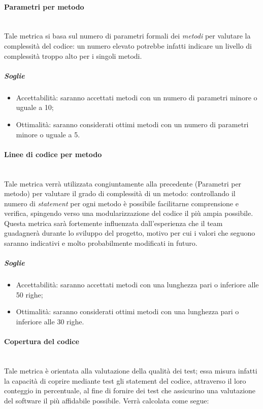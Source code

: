 \paragraph{Parametri per metodo}
	~\\Tale metrica si basa sul numero di parametri formali dei \emph{metodi} per valutare la complessità del codice: un numero elevato potrebbe infatti indicare un livello di complessità troppo alto per i singoli metodi.

\subparagraph{Soglie}
	\begin{itemize}
	\item Accettabilità: saranno accettati metodi con un numero di parametri minore o uguale a 10;
	\item Ottimalità: saranno considerati ottimi metodi con un numero di parametri minore o uguale a 5.
	\end{itemize}

\paragraph{Linee di codice per metodo}
	~\\Tale metrica verrà utilizzata congiuntamente alla precedente (Parametri per metodo) per valutare il grado di complessità di un metodo: controllando il numero di \emph{statement} per ogni metodo è possibile facilitarne comprensione e verifica, spingendo verso una modularizzazione del codice il più ampia possibile. 
Questa metrica sarà fortemente influenzata dall'esperienza che il team guadagnerà durante lo sviluppo del progetto, motivo per cui i valori che seguono saranno indicativi e molto probabilmente modificati in futuro.

\subparagraph{Soglie}
	\begin{itemize}
	\item Accettabilità: saranno accettati metodi con una lunghezza pari o inferiore alle  50 righe;
	\item Ottimalità: saranno considerati ottimi metodi con una lunghezza pari o inferiore alle 30 righe.
	\end{itemize}

\paragraph{Copertura del codice}
	~\\Tale metrica è orientata alla valutazione della qualità dei test; essa misura infatti la capacità di coprire mediante test gli statement del codice, attraverso il loro conteggio in percentuale, al fine di fornire dei test che assicurino una valutazione del software il più affidabile possibile. Verrà calcolata come segue:

